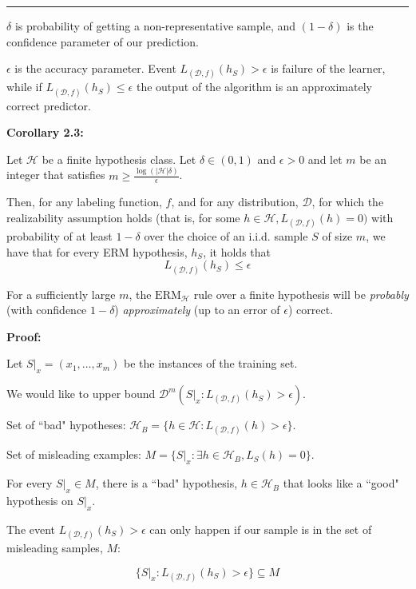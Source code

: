 \smallskip

\hrule height 0.06pt

\smallskip

$\delta$ is probability of getting a non-representative sample, and $(1-\delta)$ is the confidence parameter of our prediction.

$\epsilon$ is the accuracy parameter. Event $L_{(\mathcal{D}, f)}(h_S) > \epsilon$ is failure of the learner, while if $L_{(\mathcal{D}, f)}(h_S) \leq \epsilon$ the output of the algorithm is an approximately correct predictor.

\textbf{Corollary 2.3:}

Let $\mathcal{H}$ be a finite hypothesis class. Let $\delta \in (0, 1)$ and $\epsilon > 0$ and let $m$ be an integer that satisfies $m \geq \frac{\log(|\mathcal{H}| \delta)}{\epsilon}$.

Then, for any labeling function, $f$, and for any distribution, $\mathcal{D}$, for which the realizability assumption holds (that is, for some $h \in \mathcal{H}, L_{(\mathcal{D}, f)}(h) = 0)$ with probability of at least $1-\delta$ over the choice of an i.i.d. sample $S$ of size $m$, we have that for every ERM hypothesis, $h_S$, it holds that 
    $$L_{(\mathcal{D}, f)}(h_S) \leq \epsilon$$

\medskip

For a sufficiently large $m$, the $\text{ERM}_\mathcal{H}$ rule over a finite hypothesis will be \textit{probably} (with confidence $1-\delta$) \textit{approximately} (up to an error of $\epsilon$) correct.

\medskip

\textbf{Proof:}

Let $S|_x = (x_1, \dots, x_m)$ be the instances of the training set.

We would like to upper bound $\mathcal{D}^m({S|_x : L_{(\mathcal{D}, f)}(h_S) > \epsilon})$.

Set of ``bad" hypotheses: $\mathcal{H}_B = \{ h \in \mathcal{H} : L_{(\mathcal{D}, f)}(h) > \epsilon \}$.

Set of misleading examples: $M = \{S|_x : \exists h \in \mathcal{H}_B, L_S(h) = 0\}$.

For every $S|_x \in M$, there is a ``bad" hypothesis, $h \in \mathcal{H}_B$ that looks like a ``good" hypothesis on $S|_x$.

The event $L_{(\mathcal{D}, f)} (h_S) > \epsilon$ can only happen if our sample is in the set of misleading samples, $M$: 

$$\{ S |_x : L_{(\mathcal{D}, f)} (h_S) > \epsilon \} \subseteq M$$


